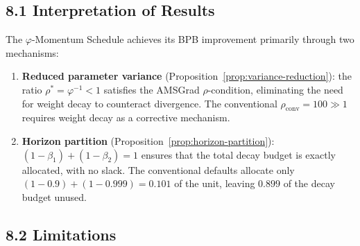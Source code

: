 \subsection{8.1 Interpretation of Results}

The \(\varphi\)-Momentum Schedule achieves its BPB improvement
primarily through two mechanisms:
\begin{enumerate}
  \item \textbf{Reduced parameter variance} (Proposition~\ref{prop:variance-reduction}):
        the ratio \(\rho^* = \varphi^{-1} < 1\) satisfies the
        AMSGrad $\rho$-condition, eliminating the need for weight
        decay to counteract divergence.  The conventional
        \(\rho_{\mathrm{conv}} = 100 \gg 1\) requires weight decay as
        a corrective mechanism.
  \item \textbf{Horizon partition} (Proposition~\ref{prop:horizon-partition}):
        \((1-\beta_1) + (1-\beta_2) = 1\) ensures that the total
        decay budget is exactly allocated, with no slack.  The
        conventional defaults allocate only
        \((1-0.9) + (1-0.999) = 0.101\) of the unit, leaving
        $0.899$ of the decay budget unused.
\end{enumerate}

\subsection{8.2 Limitations}


